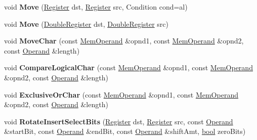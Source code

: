 \begin{DoxyCompactItemize}
\item 
\mbox{\label{classv8_1_1internal_1_1TurboAssembler_a88d5d9a1115804b2765416e4d7fec7cf}} 
void {\bfseries Move} (\mbox{\hyperlink{classv8_1_1internal_1_1Register}{Register}} dst, \mbox{\hyperlink{classv8_1_1internal_1_1Register}{Register}} src, Condition cond=al)
\item 
\mbox{\label{classv8_1_1internal_1_1TurboAssembler_a66243b5b30ca95a06e9b54ac137c3e30}} 
void {\bfseries Move} (\mbox{\hyperlink{classv8_1_1internal_1_1DoubleRegister}{Double\+Register}} dst, \mbox{\hyperlink{classv8_1_1internal_1_1DoubleRegister}{Double\+Register}} src)
\item 
\mbox{\label{classv8_1_1internal_1_1TurboAssembler_a3bed75417223cfbaa4cfe03cd4abd72c}} 
void {\bfseries Move\+Char} (const \mbox{\hyperlink{classv8_1_1internal_1_1MemOperand}{Mem\+Operand}} \&opnd1, const \mbox{\hyperlink{classv8_1_1internal_1_1MemOperand}{Mem\+Operand}} \&opnd2, const \mbox{\hyperlink{classv8_1_1internal_1_1Operand}{Operand}} \&length)
\item 
\mbox{\label{classv8_1_1internal_1_1TurboAssembler_ab159e6c5d49e6415f1bd5250cbd64743}} 
void {\bfseries Compare\+Logical\+Char} (const \mbox{\hyperlink{classv8_1_1internal_1_1MemOperand}{Mem\+Operand}} \&opnd1, const \mbox{\hyperlink{classv8_1_1internal_1_1MemOperand}{Mem\+Operand}} \&opnd2, const \mbox{\hyperlink{classv8_1_1internal_1_1Operand}{Operand}} \&length)
\item 
\mbox{\label{classv8_1_1internal_1_1TurboAssembler_af1c54c131e9377934b69ef1919108d67}} 
void {\bfseries Exclusive\+Or\+Char} (const \mbox{\hyperlink{classv8_1_1internal_1_1MemOperand}{Mem\+Operand}} \&opnd1, const \mbox{\hyperlink{classv8_1_1internal_1_1MemOperand}{Mem\+Operand}} \&opnd2, const \mbox{\hyperlink{classv8_1_1internal_1_1Operand}{Operand}} \&length)
\item 
\mbox{\label{classv8_1_1internal_1_1TurboAssembler_a2e05ad13056d1c24df3242cea4ad4662}} 
void {\bfseries Rotate\+Insert\+Select\+Bits} (\mbox{\hyperlink{classv8_1_1internal_1_1Register}{Register}} dst, \mbox{\hyperlink{classv8_1_1internal_1_1Register}{Register}} src, const \mbox{\hyperlink{classv8_1_1internal_1_1Operand}{Operand}} \&start\+Bit, const \mbox{\hyperlink{classv8_1_1internal_1_1Operand}{Operand}} \&end\+Bit, const \mbox{\hyperlink{classv8_1_1internal_1_1Operand}{Operand}} \&shift\+Amt, \mbox{\hyperlink{classbool}{bool}} zero\+Bits)

\end{DoxyCompactItemize}
